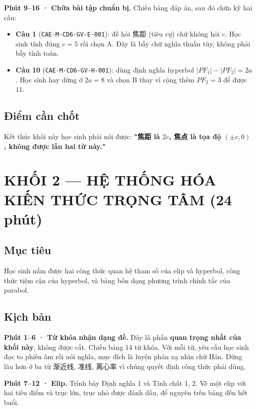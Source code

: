 \documentclass[11pt, a4paper]{article}
\begin{document}
\textbf{Phút 9–16 · Chữa bài tập chuẩn bị.} Chiếu bảng đáp án, sau đó chữa kỹ hai câu:

\begin{itemize}[leftmargin=1.4em, itemsep=2pt]
\item \textbf{Câu 1} (\texttt{CAE-M-CD6-GV-E-001}): đề hỏi 焦距 (tiêu cự) chứ không hỏi $c$. Học sinh tính đúng $c = 5$ rồi chọn A. Đây là bẫy chữ nghĩa thuần túy, không phải bẫy tính toán.
\item \textbf{Câu 10} (\texttt{CAE-M-CD6-GV-H-001}): dùng định nghĩa hyperbol $|PF_1| - |PF_2| = 2a$. Học sinh hay dừng ở $2a = 8$ và chọn B thay vì cộng thêm $PF_2 = 3$ để được $11$.
\end{itemize}

\subsection{Điểm cần chốt}

Kết thúc khối này học sinh phải nói được: \textbf{"焦距 là $2c$, 焦点 là tọa độ $(\pm c, 0)$, không được lẫn hai từ này."}

\section{KHỐI 2 — HỆ THỐNG HÓA KIẾN THỨC TRỌNG TÂM (24 phút)}

\subsection{Mục tiêu}

Học sinh nắm được hai công thức quan hệ tham số của elip và hyperbol, công thức tiệm cận của hyperbol, và bảng bốn dạng phương trình chính tắc của parabol.

\subsection{Kịch bản}

\textbf{Phút 1–6 · Từ khóa nhận dạng đề.} Đây là phần \textbf{quan trọng nhất của khối này}, không được cắt. Chiếu bảng 14 từ khóa. Với mỗi từ, yêu cầu học sinh đọc to phiên âm rồi nói nghĩa, mục đích là luyện phản xạ nhìn chữ Hán. Dừng lâu hơn ở ba từ 渐近线, 准线, 离心率 vì chúng quyết định công thức phải dùng.

\textbf{Phút 7–12 · Elip.} Trình bày Định nghĩa 1 và Tính chất 1, 2. Vẽ một elip với hai tiêu điểm và trục lớn, trục nhỏ được đánh dấu, để nguyên trên bảng đến hết buổi.
\end{document}
